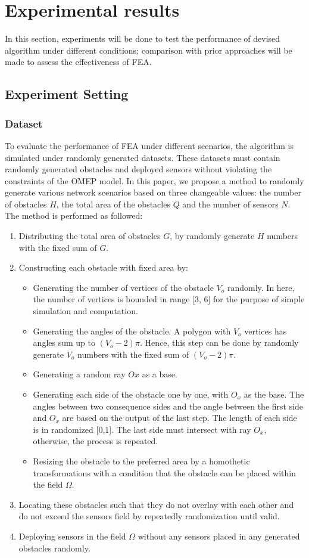 \documentclass[final]{elsarticle}
\begin{document}
\section{Experimental results}
In this section, experiments will be done to test the performance of devised algorithm under different conditions; comparison with prior approaches will be made to assess the effectiveness of FEA. 
\subsection{Experiment Setting}
\subsubsection{Dataset}
To evaluate the performance of FEA under different scenarios, the algorithm is simulated under randomly generated datasets. These datasets must contain randomly generated obstacles and deployed sensors without violating the constraints of the OMEP model. In this paper, we propose a method to randomly generate various network scenarios based on three changeable values: the number of obstacles $H$, the total area of the obstacles $Q$ and the number of sensors $N$. The method is performed as followed: 

\begin{enumerate}
	\item Distributing the total area of obstacles $G$, by randomly generate $H$ numbers with the fixed sum of $G$.
	\item Constructing each obstacle with fixed area by:
	\begin{itemize}
		\item Generating the number of vertices of the obstacle $V_o$ randomly. In here, the number of vertices is bounded in range [3, 6] for the purpose of simple simulation and computation. 
		\item Generating the angles of the obstacle. A polygon with $V_o$ vertices has angles sum up to $(V_o - 2)\pi$. Hence, this step can be done by randomly generate $V_o$ numbers with the fixed sum of $(V_o - 2)\pi$.
		\item Generating a random ray $Ox$ as a base.
		\item Generating each side of the obstacle one by one, with $O_x$ as the base. The angles between two consequence sides and the angle between the first side and $O_x$ are based on the output of the last step. The length of each side is in randomized [0,1]. The last side must intersect with ray $O_x$, otherwise, the process is repeated.
		\item Resizing the obstacle to the preferred area by a homothetic transformations with a condition that the obstacle can be placed within the field $\Omega$.
	\end{itemize}
	\item Locating these obstacles such that they do not overlay with each other and do not exceed the sensors field by repeatedly randomization until valid.
	\item Deploying sensors in the field $\Omega$ without any sensors placed in any generated obstacles randomly.
\end{enumerate}
\end{document}
